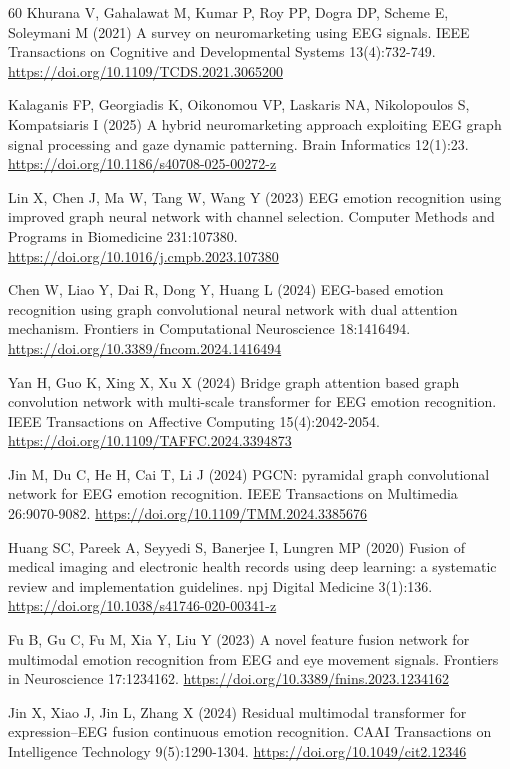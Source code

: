 \documentclass[pdflatex,sn-basic,Numbered,twocolumn,iicol]{sn-jnl}
\theoremstyle{thmstyleone}%
\theoremstyle{thmstyletwo}%
\theoremstyle{thmstylethree}%
\begin{document}
\begin{thebibliography}{60}
 Khurana V, Gahalawat M, Kumar P, Roy PP, Dogra DP, Scheme E, Soleymani M (2021) A survey on neuromarketing using EEG signals. IEEE Transactions on Cognitive and Developmental Systems 13(4):732-749. \url{https://doi.org/10.1109/TCDS.2021.3065200}

 Kalaganis FP, Georgiadis K, Oikonomou VP, Laskaris NA, Nikolopoulos S, Kompatsiaris I (2025) A hybrid neuromarketing approach exploiting EEG graph signal processing and gaze dynamic patterning. Brain Informatics 12(1):23. \url{https://doi.org/10.1186/s40708-025-00272-z}

 Lin X, Chen J, Ma W, Tang W, Wang Y (2023) EEG emotion recognition using improved graph neural network with channel selection. Computer Methods and Programs in Biomedicine 231:107380. \url{https://doi.org/10.1016/j.cmpb.2023.107380}

 Chen W, Liao Y, Dai R, Dong Y, Huang L (2024) EEG-based emotion recognition using graph convolutional neural network with dual attention mechanism. Frontiers in Computational Neuroscience 18:1416494. \url{https://doi.org/10.3389/fncom.2024.1416494}

 Yan H, Guo K, Xing X, Xu X (2024) Bridge graph attention based graph convolution network with multi-scale transformer for EEG emotion recognition. IEEE Transactions on Affective Computing 15(4):2042-2054. \url{https://doi.org/10.1109/TAFFC.2024.3394873}

 Jin M, Du C, He H, Cai T, Li J (2024) PGCN: pyramidal graph convolutional network for EEG emotion recognition. IEEE Transactions on Multimedia 26:9070-9082. \url{https://doi.org/10.1109/TMM.2024.3385676}

 Huang SC, Pareek A, Seyyedi S, Banerjee I, Lungren MP (2020) Fusion of medical imaging and electronic health records using deep learning: a systematic review and implementation guidelines. npj Digital Medicine 3(1):136. \url{https://doi.org/10.1038/s41746-020-00341-z}

 Fu B, Gu C, Fu M, Xia Y, Liu Y (2023) A novel feature fusion network for multimodal emotion recognition from EEG and eye movement signals. Frontiers in Neuroscience 17:1234162. \url{https://doi.org/10.3389/fnins.2023.1234162}

 Jin X, Xiao J, Jin L, Zhang X (2024) Residual multimodal transformer for expression--EEG fusion continuous emotion recognition. CAAI Transactions on Intelligence Technology 9(5):1290-1304. \url{https://doi.org/10.1049/cit2.12346}


\end{thebibliography}
\end{document}
